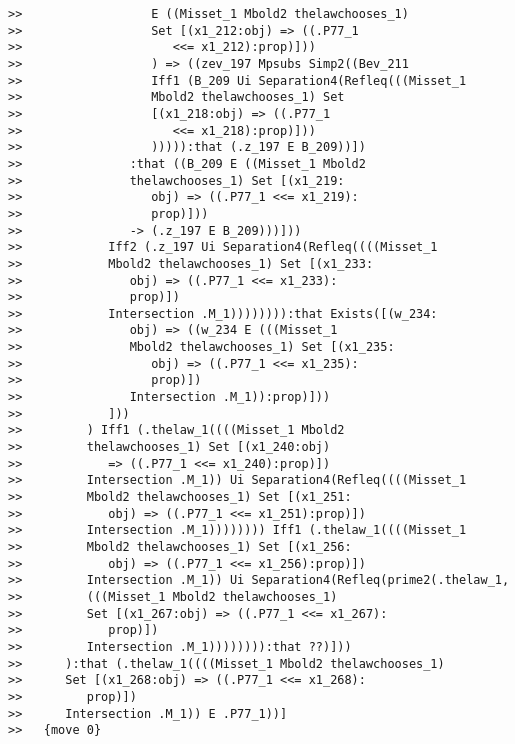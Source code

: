 \documentclass[12pt]{article}
\begin{document}
\begin{verbatim}
>>                  E ((Misset_1 Mbold2 thelawchooses_1)
>>                  Set [(x1_212:obj) => ((.P77_1
>>                     <<= x1_212):prop)]))
>>                  ) => ((zev_197 Mpsubs Simp2((Bev_211
>>                  Iff1 (B_209 Ui Separation4(Refleq(((Misset_1
>>                  Mbold2 thelawchooses_1) Set
>>                  [(x1_218:obj) => ((.P77_1
>>                     <<= x1_218):prop)]))
>>                  ))))):that (.z_197 E B_209))])
>>               :that ((B_209 E ((Misset_1 Mbold2
>>               thelawchooses_1) Set [(x1_219:
>>                  obj) => ((.P77_1 <<= x1_219):
>>                  prop)]))
>>               -> (.z_197 E B_209)))]))
>>            Iff2 (.z_197 Ui Separation4(Refleq((((Misset_1
>>            Mbold2 thelawchooses_1) Set [(x1_233:
>>               obj) => ((.P77_1 <<= x1_233):
>>               prop)])
>>            Intersection .M_1)))))))):that Exists([(w_234:
>>               obj) => ((w_234 E (((Misset_1
>>               Mbold2 thelawchooses_1) Set [(x1_235:
>>                  obj) => ((.P77_1 <<= x1_235):
>>                  prop)])
>>               Intersection .M_1)):prop)]))
>>            ]))
>>         ) Iff1 (.thelaw_1((((Misset_1 Mbold2
>>         thelawchooses_1) Set [(x1_240:obj)
>>            => ((.P77_1 <<= x1_240):prop)])
>>         Intersection .M_1)) Ui Separation4(Refleq((((Misset_1
>>         Mbold2 thelawchooses_1) Set [(x1_251:
>>            obj) => ((.P77_1 <<= x1_251):prop)])
>>         Intersection .M_1)))))))) Iff1 (.thelaw_1((((Misset_1
>>         Mbold2 thelawchooses_1) Set [(x1_256:
>>            obj) => ((.P77_1 <<= x1_256):prop)])
>>         Intersection .M_1)) Ui Separation4(Refleq(prime2(.thelaw_1,
>>         (((Misset_1 Mbold2 thelawchooses_1)
>>         Set [(x1_267:obj) => ((.P77_1 <<= x1_267):
>>            prop)])
>>         Intersection .M_1)))))))):that ??)]))
>>      ):that (.thelaw_1((((Misset_1 Mbold2 thelawchooses_1)
>>      Set [(x1_268:obj) => ((.P77_1 <<= x1_268):
>>         prop)])
>>      Intersection .M_1)) E .P77_1))]
>>   {move 0}



\end{verbatim}
\end{document}

